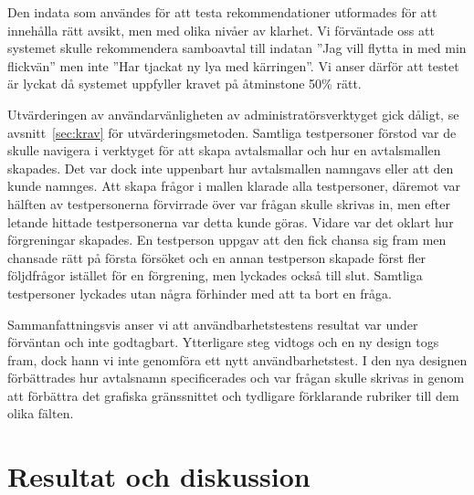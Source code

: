 \documentclass[a4paper,12pt]{article}
\begin{document}
Den indata som användes för att testa rekommendationer utformades för att innehålla rätt avsikt, men med olika nivåer av klarhet. Vi förväntade oss att systemet skulle rekommendera samboavtal till indatan ''Jag vill flytta in med min flickvän'' men inte ''Har tjackat ny lya med kärringen''. Vi anser därför att testet är lyckat då systemet uppfyller kravet på åtminstone 50\% rätt.

Utvärderingen av användarvänligheten av administratörsverktyget gick dåligt, se avsnitt~\ref{sec:krav} för utvärderingsmetoden. Samtliga testpersoner förstod var de skulle navigera i verktyget för att skapa avtalsmallar och hur en avtalsmallen skapades. Det var dock inte uppenbart hur avtalsmallen namngavs eller att den kunde namnges. Att skapa frågor i mallen klarade alla testpersoner, däremot var hälften av testpersonerna förvirrade över var frågan skulle skrivas in, men efter letande hittade testpersonerna var detta kunde göras. 
Vidare var det oklart hur förgreningar skapades. En testperson uppgav att den fick chansa sig fram men chansade rätt på första försöket och en annan testperson skapade först fler följdfrågor istället för en förgrening, men lyckades också till slut. Samtliga testpersoner lyckades utan några förhinder med att ta bort en fråga. 




Sammanfattningsvis anser vi att användbarhetstestens resultat var under förväntan och inte godtagbart. Ytterligare steg vidtogs och en ny design togs fram, dock hann vi inte genomföra ett nytt användbarhetstest. I den nya designen förbättrades hur avtalsnamn specificerades och var frågan skulle skrivas in genom att förbättra det grafiska gränssnittet och tydligare förklarande rubriker till dem olika fälten. 
%


\section{Resultat och diskussion}
\end{document}
